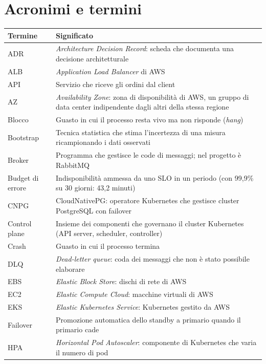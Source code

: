 \chapter*{Acronimi e termini}

\begin{longtable}{@{}lp{11.5cm}@{}}
\toprule
\textbf{Termine} & \textbf{Significato} \\
\midrule
\endhead
\bottomrule
\endfoot
ADR      & \textit{Architecture Decision Record}: scheda che documenta una decisione architetturale \\
ALB      & \textit{Application Load Balancer} di AWS \\
API      & Servizio che riceve gli ordini dal client \\
AZ       & \textit{Availability Zone}: zona di disponibilità di AWS, un gruppo di data center indipendente dagli altri della stessa regione \\
Blocco   & Guasto in cui il processo resta vivo ma non risponde (\textit{hang}) \\
Bootstrap & Tecnica statistica che stima l'incertezza di una misura ricampionando i dati osservati \\
Broker   & Programma che gestisce le code di messaggi; nel progetto è RabbitMQ \\
Budget di errore & Indisponibilità ammessa da uno SLO in un periodo (con 99,9\% su 30 giorni: 43,2 minuti) \\
CNPG     & CloudNativePG: operatore Kubernetes che gestisce cluster PostgreSQL con failover \\
Control plane & Insieme dei componenti che governano il cluster Kubernetes (API server, scheduler, controller) \\
Crash    & Guasto in cui il processo termina \\
DLQ      & \textit{Dead-letter queue}: coda dei messaggi che non è stato possibile elaborare \\
EBS      & \textit{Elastic Block Store}: dischi di rete di AWS \\
EC2      & \textit{Elastic Compute Cloud}: macchine virtuali di AWS \\
EKS      & \textit{Elastic Kubernetes Service}: Kubernetes gestito da AWS \\
Failover & Promozione automatica dello standby a primario quando il primario cade \\
HPA      & \textit{Horizontal Pod Autoscaler}: componente di Kubernetes che varia il numero di pod \\

\end{longtable}
